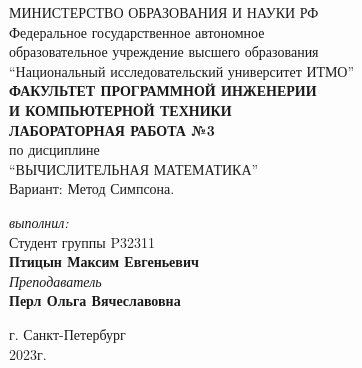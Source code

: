 \begin{center}
	МИНИСТЕРСТВО ОБРАЗОВАНИЯ И НАУКИ РФ\\
	\hfill \break
	Федеральное государственное автономное\\
	образовательное учреждение высшего образования\\
	``Национальный исследовательский университет ИТМО''\\
	\hfill \break
	\textbf{ФАКУЛЬТЕТ ПРОГРАММНОЙ ИНЖЕНЕРИИ \\
	И КОМПЬЮТЕРНОЙ ТЕХНИКИ}\\
	\vspace{2cm}
	\large{\textbf{ЛАБОРАТОРНАЯ РАБОТА №3}}\\
	\hfill \break
	по дисциплине\\
		\large{``ВЫЧИСЛИТЕЛЬНАЯ МАТЕМАТИКА''}\\
	\hfill \break
	Вариант: Метод Симпсона. \\
	\vspace{5cm}
	\begin{flushright}
	\textit{выполнил:}\\
	Студент группы P32311\\
	\textbf{Птицын Максим Евгеньевич}\\
	\textit{Преподаватель}\\
	\textbf{Перл Ольга Вячеславовна}
	\end{flushright}
\end{center}

\vfill

\begin{center}
	г. Санкт-Петербург\\2023г.
\end{center}
\thispagestyle{empty}
\newpage
